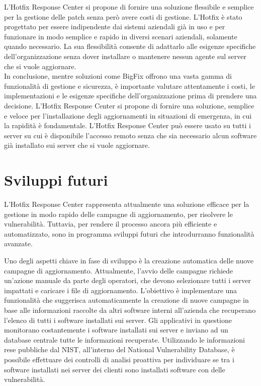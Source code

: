 L'Hotfix Response Center si propone di fornire una soluzione flessibile e semplice 
per la gestione delle patch senza però avere costi di gestione. L’Hotfix è stato 
progettato per essere indipendente dai sistemi aziendali già in uso e per funzionare 
in modo semplice e rapido in diversi scenari aziendali, solamente quando necessario. 
La sua flessibilità consente di adattarlo alle esigenze specifiche dell'organizzazione 
senza dover installare o mantenere nessun agente sul server che si vuole aggiornare.\\

In conclusione, mentre soluzioni come BigFix offrono una vasta gamma di funzionalità di 
gestione e sicurezza, è importante valutare attentamente i costi, le implementazioni e 
le esigenze specifiche dell'organizzazione prima di prendere una decisione. 
L'Hotfix Response Center si propone di fornire una soluzione, semplice e veloce per 
l’installazione degli aggiornamenti in situazioni di emergenza, in cui la rapidità è 
fondamentale. 
L’Hotfix Response Center può essere usato su tutti i server su cui è 
disponibile l’accesso remoto senza che sia necessario alcun software già installato 
sui server che si vuole aggiornare.

\section{Sviluppi futuri}
L’Hotfix Response Center rappresenta attualmente una soluzione efficace per la gestione in 
modo rapido delle campagne di aggiornamento, per risolvere le vulnerabilità. Tuttavia, per 
rendere il processo ancora più efficiente e automatizzato, sono in programma sviluppi futuri 
che introdurranno funzionalità avanzate.

Uno degli aspetti chiave in fase di sviluppo è la creazione automatica delle nuove campagne 
di aggiornamento. 
Attualmente, l'avvio delle campagne richiede un'azione manuale da parte degli operatori, che 
devono selezionare tutti i server impattati e caricare i file di aggiornamento. L'obiettivo 
è implementare una funzionalità che suggerisca automaticamente la creazione di nuove campagne 
in base alle informazioni raccolte da altri software interni all’azienda che recuperano 
l’elenco di tutti i software installati sui server.
Gli applicativi in questione monitorano costantemente i software installati sui server e 
inviano ad un database centrale tutte le informazioni recuperate.
Utilizzando le informazioni rese pubbliche dal NIST, all’interno del National Vulnerability 
Database, è possibile effettuare dei controlli di analisi proattiva per individuare se tra i 
software installati nei server dei clienti sono installati software con delle vulnerabilità.

